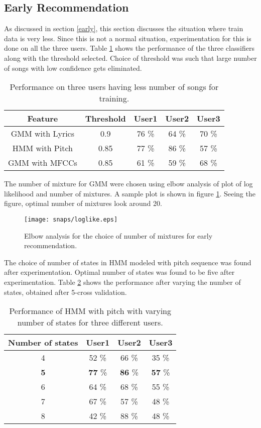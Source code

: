 \subsection{Early Recommendation}
As discussed in section \ref{early}, this section discusses the situation where train data is very less. Since this is not a normal situation, experimentation for this is done on all the three users. Table \ref{tab:early} shows the performance of the three classifiers along with the threshold selected. Choice of threshold was such that large number of songs with low confidence gets eliminated.
\begin{table}[!htbp]
\begin{center}
\begin{tabular}{ |c|c|c|c|c| } 
 \hline
  Feature & Threshold & User1 & User2 & User3 \\ \hline
 GMM with Lyrics & 0.9 & 76 \% & 64 \% & 70 \% \\ 
 HMM with Pitch & 0.85 & 77 \% & 86 \%  & 57 \% \\
 GMM with MFCCs & 0.85 & 61 \% & 59 \% & 68 \% \\ \hline
 \end{tabular}
\end{center}
\caption{Performance on three users having less number of songs for training.} \label{tab:early}
\end{table}
\par The number of mixture for GMM were chosen using elbow analysis of plot of log likelihood and number of mixtures. A sample plot is shown in figure \ref{fig:elbow}. Seeing the figure, optimal number of mixtures look around 20.
\begin{figure}[!htpb]
   \begin{center}
	    \texttt{[image: snaps/loglike.eps]}     
     \caption {Elbow analysis for the choice of number of mixtures for early recommendation.}
   \label{fig:elbow}
   \end{center}
 \end{figure}
\par The choice of number of states in HMM modeled with pitch sequence was found after experimentation. Optimal number of states was found to be five after experimentation. Table \ref{tab:hmmproof} shows the performance after varying the number of states, obtained after 5-cross validation.
\begin{table}[!htbp]
\begin{center}
\begin{tabular}{ |c|c|c|c| } 
 \hline
  Number of states  & User1 & User2 & User3 \\ \hline
 4  & 52 \% & 66 \% & 35 \% \\ 
 \textbf{5} & \textbf{77} \% & \textbf{86} \%  & \textbf{57} \% \\
 6 & 64 \% & 68 \% & 55 \% \\ 
7 & 67 \% & 57 \% & 48 \% \\ 
8 & 42 \% & 88 \% & 48 \% \\ \hline
 \end{tabular}
\end{center}
\caption{Performance of HMM with pitch with varying number of states for three different users.} \label{tab:hmmproof}
\end{table}
